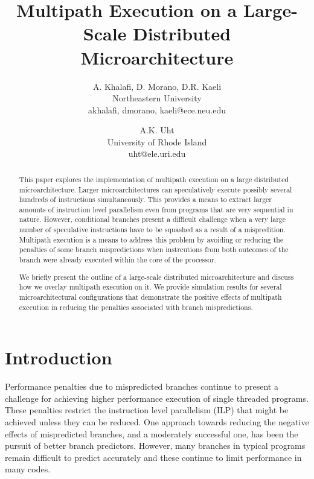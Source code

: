 \documentclass[10pt,dvips]{article}
\begin{document}
\parskip 3mm
%
%
\title{Multipath Execution on a Large-Scale Distributed 
Microarchitecture}
%
\author{
A. Khalafi, D. Morano, D.R. Kaeli\\
Northeastern University\\
{akhalafi, dmorano, kaeli}@ece.neu.edu\\
\and
A.K. Uht \\
University of Rhode Island\\ uht@ele.uri.edu
}
%
\maketitle
\thispagestyle{empty}
%
\begin{abstract}
This paper explores the implementation of multipath execution on a
large distributed microarchitecture.  Larger microarchitectures can
speculatively execute possibly several hundreds of instructions
simultaneously.  This provides a means to extract larger amounts of
instruction level parallelism even from programs that are very
sequential in nature.  However, conditional branches present a
difficult challenge when a very large number of speculative
instructions have to be squashed as a result of a mispredition.
Multipath execution is a means to address this problem
by avoiding or reducing the penalties of some branch mispredictions when
instrcutions from both outcomes of the branch were
already executed within the core of the processor.

We briefly present the outline of a large-scale distributed
microarchitecture and discuss how we overlay multipath execution on
it.  We provide simulation results for several microarchitectural
configurations that demonstrate the positive effects of multipath
execution in reducing the penalties associated with branch
mispredictions.
\end{abstract}
%
\section{Introduction}
%
Performance penalties due to mispredicted branches continue to
present a challenge for achieving higher performance execution
of single threaded programs.
These penalties restrict the instruction level parallelism (ILP)
that might be achieved unless they can be reduced.
One approach towards reducing the negative effects of mispredicted
branches, and a moderately successful one, has been the pursuit
of better branch predictors.  However, many branches in typical
programs remain difficult to predict accurately and these continue
to limit performance in many codes.
\end{document}
